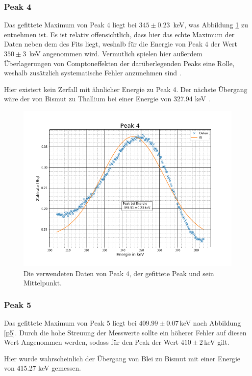 \subsubsection{Peak 4}
Das gefittete Maximum von Peak 4 liegt bei $345\pm0.23\,$ keV, was Abbildung \ref{p4} zu entnehmen ist. Es ist relativ offensichtlich, dass hier das echte Maximum der Daten neben dem des Fits liegt, weshalb für die Energie von Peak 4 der Wert $350\pm3\,$ keV angenommen wird. Vermutlich spielen hier außerdem Überlagerungen von Comptoneffekten der darüberlegenden Peaks eine Rolle, weshalb zusätzlich systematische Fehler anzunehmen sind \cite{staatsex_szinti}.\par
Hier existert kein Zerfall mit ähnlicher Energie zu Peak 4. Der nächste Übergang wäre der von Bismut zu Thallium bei einer Energie von 327.94 keV \cite{Bismut}. 
\begin{figure}[h]
	\centering
	\includegraphics[scale=0.7]{Bilder/Anhang/P4}
	\caption[Thorium Peak 4]{\small Die verwendeten Daten von Peak 4, der gefittete Peak und sein Mittelpunkt.}
	\label{p4}
\end{figure}

\subsubsection{Peak 5}
Das gefittete Maximum von Peak 5 liegt bei $409.99\pm0.07\,$keV nach Abbildung \ref{p5}. Durch die hohe Streuung der Messwerte sollte ein höherer Fehler auf diesen Wert Angenommen werden, sodass für den Peak der Wert $410\pm2\,$keV gilt.\par
Hier wurde wahrscheinlich der Übergang von Blei zu Bismut mit einer Energie von 415.27 keV \cite{Blei} gemessen. 

